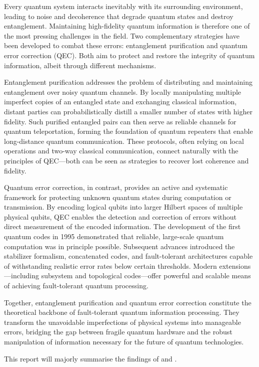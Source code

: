 \documentclass[conference]{IEEEtran}
\begin{document}
Every quantum system interacts inevitably with its surrounding environment, leading to noise and decoherence that degrade quantum states and destroy entanglement. Maintaining high-fidelity quantum information is therefore one of the most pressing challenges in the field. Two complementary strategies have been developed to combat these errors: entanglement purification and quantum error correction (QEC). Both aim to protect and restore the integrity of quantum information, albeit through different mechanisms.

Entanglement purification addresses the problem of distributing and maintaining entanglement over noisy quantum channels. By locally manipulating multiple imperfect copies of an entangled state and exchanging classical information, distant parties can probabilistically distill a smaller number of states with higher fidelity. Such purified entangled pairs can then serve as reliable channels for quantum teleportation, forming the foundation of quantum repeaters that enable long-distance quantum communication. These protocols, often relying on local operations and two-way classical communication, connect naturally with the principles of QEC—both can be seen as strategies to recover lost coherence and fidelity.

Quantum error correction, in contrast, provides an active and systematic framework for protecting unknown quantum states during computation or transmission. By encoding logical qubits into larger Hilbert spaces of multiple physical qubits, QEC enables the detection and correction of errors without direct measurement of the encoded information. The development of the first quantum codes in 1995 demonstrated that reliable, large-scale quantum computation was in principle possible. Subsequent advances introduced the stabilizer formalism, concatenated codes, and fault-tolerant architectures capable of withstanding realistic error rates below certain thresholds. Modern extensions—including subsystem and topological codes—offer powerful and scalable means of achieving fault-tolerant quantum processing.

Together, entanglement purification and quantum error correction constitute the theoretical backbone of fault-tolerant quantum information processing. They transform the unavoidable imperfections of physical systems into manageable errors, bridging the gap between fragile quantum hardware and the robust manipulation of information necessary for the future of quantum technologies.

This report will majorly summarise the findings of \cite{paper1} and \cite{paper2}.
\end{document}
